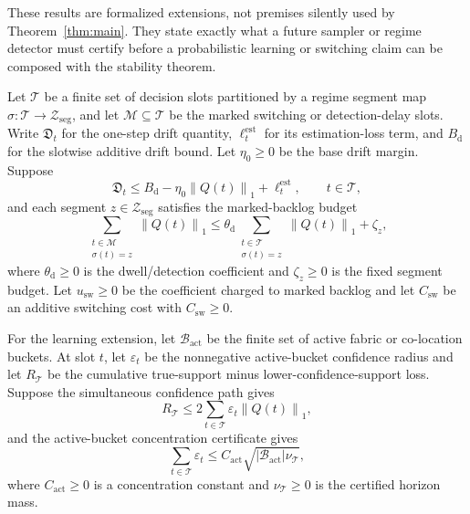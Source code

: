 \documentclass[opre,dblanonrev]{informs4}
\newcommand{\normone}[1]{\left\|#1\right\|_1}
\begin{document}
These results are formalized extensions, not premises silently used by
Theorem~\ref{thm:main}.  They state exactly what a future sampler or regime
detector must certify before a probabilistic learning or switching claim can be
composed with the stability theorem.

Let \(\mathcal T\) be a finite set of decision slots partitioned by a regime
segment map \(\sigma:\mathcal T\to\mathcal Z_{\mathrm{seg}}\), and let
\(\mathcal M\subseteq\mathcal T\) be the marked switching or detection-delay
slots.  Write \(\mathfrak D_t\) for the one-step drift quantity,
\(\ell_t^{\mathrm{est}}\) for its estimation-loss term, and
\(B_{\mathrm d}\) for the slotwise additive drift bound.  Let
\(\eta_0\ge0\) be the base drift margin.  Suppose
\begin{equation}
  \mathfrak D_t
  \le B_{\mathrm d}-\eta_0\normone{Q(t)}+\ell_t^{\mathrm{est}},
  \qquad t\in\mathcal T,
  \label{eq:ec-regime-step-drift}
\end{equation}
and each segment \(z\in\mathcal Z_{\mathrm{seg}}\) satisfies the
marked-backlog budget
\begin{equation}
  \sum_{\substack{t\in\mathcal M\\\sigma(t)=z}}\normone{Q(t)}
  \le
  \theta_{\mathrm d}
  \sum_{\substack{t\in\mathcal T\\\sigma(t)=z}}\normone{Q(t)}+\zeta_z,
  \label{eq:ec-regime-marked-budget}
\end{equation}
where \(\theta_{\mathrm d}\ge0\) is the dwell/detection coefficient and
\(\zeta_z\ge0\) is the fixed segment budget.  Let
\(u_{\mathrm{sw}}\ge0\) be the coefficient
charged to marked backlog and let \(C_{\mathrm{sw}}\) be an additive switching
cost with \(C_{\mathrm{sw}}\ge0\).

For the learning extension, let \(\mathcal B_{\mathrm{act}}\) be the finite set
of active fabric or co-location buckets.  At slot \(t\), let \(\varepsilon_t\)
be the nonnegative active-bucket confidence radius and let \(R_{\mathcal T}\) be the
cumulative true-support minus lower-confidence-support loss.  Suppose the
simultaneous confidence path gives
\begin{equation}
  R_{\mathcal T}
  \le 2\sum_{t\in\mathcal T}
    \varepsilon_t\normone{Q(t)},
  \label{eq:ec-active-path-loss}
\end{equation}
and the active-bucket concentration certificate gives
\begin{equation}
  \sum_{t\in\mathcal T}\varepsilon_t
  \le C_{\mathrm{act}}
    \sqrt{|\mathcal B_{\mathrm{act}}|\nu_{\mathcal T}},
  \label{eq:ec-active-concentration}
\end{equation}
where \(C_{\mathrm{act}}\ge0\) is a concentration constant and
\(\nu_{\mathcal T}\ge0\) is the certified horizon mass.
\end{document}
